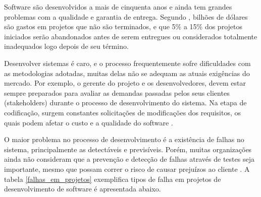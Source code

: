 Software são desenvolvidos a mais de cinquenta anos e ainda tem grandes problemas com a qualidade e garantia de entrega. Segundo , bilhões de dólares são gastos em projetos  que não são terminados, e que 5\% a 15\% dos projetos iniciados serão abandonados antes de serem entregues ou considerados totalmente inadequados logo depois de seu término.

Desenvolver sistemas é caro, e o processo frequentemente sofre dificuldades com as metodologias adotadas, muitas delas não se adequam as atuais exigências do mercado. Por exemplo, o gerente do projeto e os desenvolvedores, devem estar sempre preparados para avaliar as demandas passadas pelos seus clientes (stakeholders) durante o processo de desenvolvimento do sistema. Na etapa de codificação, surgem constantes solicitações de modificações dos requisitos, os quais podem afetar o custo e a qualidade do software \cite{CERPA}.

O maior problema no processo de desenvolvimento é a existência de falhas no sistema, principalmente as detectáveis e previsíveis. Porém, muitas organizações ainda não consideram que a prevenção e detecção de falhas através de testes seja importante, mesmo que possam correr o risco de causar prejuízos ao cliente \cite{CHARETTE}. A tabela \ref{falhas_em_projetos} exemplifica tipos de falha em projetos de desenvolvimento de software é apresentada abaixo.

